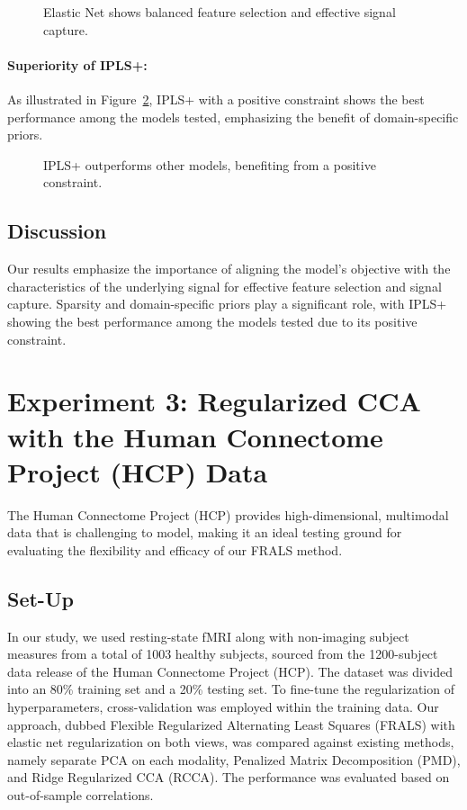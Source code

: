 \begin{figure}[h]
    \centering
    
    \caption{Elastic Net shows balanced feature selection and effective signal capture.}
    \label{fig:ElasticNet_weights}
\end{figure}

\paragraph{Superiority of IPLS+:}
As illustrated in Figure~\ref{fig:IPLS+_weights}, IPLS+ with a positive constraint shows the best performance among the models tested, emphasizing the benefit of domain-specific priors.

\begin{figure}[h]
    \centering
    
    \caption{IPLS+ outperforms other models, benefiting from a positive constraint.}
    \label{fig:IPLS+_weights}
\end{figure}

\subsection{Discussion}
Our results emphasize the importance of aligning the model's objective with the characteristics of the underlying signal for effective feature selection and signal capture. Sparsity and domain-specific priors play a significant role, with IPLS+ showing the best performance among the models tested due to its positive constraint.


\section{Experiment 3: Regularized CCA with the Human Connectome Project (HCP) Data}

The Human Connectome Project (HCP) provides high-dimensional, multimodal data that is challenging to model, making it an ideal testing ground for evaluating the flexibility and efficacy of our FRALS method.

\subsection{Set-Up}
In our study, we used resting-state fMRI along with non-imaging subject measures from a total of 1003 healthy subjects, sourced from the 1200-subject data release of the Human Connectome Project (HCP). The dataset was divided into an 80\% training set and a 20\% testing set.
To fine-tune the regularization of hyperparameters, cross-validation was employed within the training data.
Our approach, dubbed Flexible Regularized Alternating Least Squares (FRALS) with elastic net regularization on both views, was compared against existing methods, namely separate PCA on each modality, Penalized Matrix Decomposition (PMD), and Ridge Regularized CCA (RCCA). The performance was evaluated based on out-of-sample correlations.

